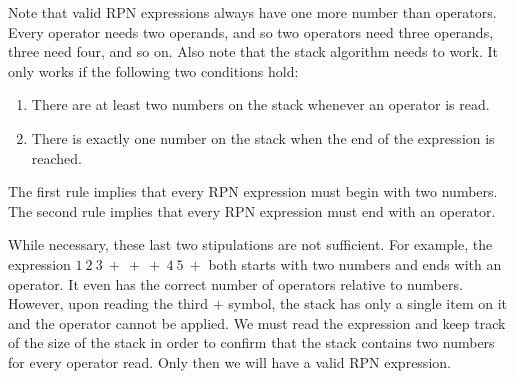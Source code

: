 \documentclass[twocolumn]{iagproc}
\begin{document}
Note that valid RPN expressions always have one more number than operators.
Every operator needs two operands, and so two operators need three operands, three need four, and so on.
Also note that the stack algorithm needs to work.
It only works if the following two conditions hold:
\begin{enumerate}
  \item There are at least two numbers on the stack whenever an operator is read.
  \item There is exactly one number on the stack when the end of the expression is reached.
\end{enumerate}
The first rule implies that every RPN expression must begin with two numbers.
The second rule implies that every RPN expression must end with an operator.

While necessary, these last two stipulations are not sufficient.
For example, the expression $1 \ 2 \ 3 \ + \ + \ + \ 4 \ 5 \ +$ both starts with two numbers and ends with an operator.
It even has the correct number of operators relative to numbers.
However, upon reading the third $+$ symbol, the stack has only a single item on it and the operator cannot be applied.
We must read the expression and keep track of the size of the stack in order to confirm that the stack contains two numbers for every operator read.
Only then we will have a valid RPN expression.

\nocite{*}


\end{document}
